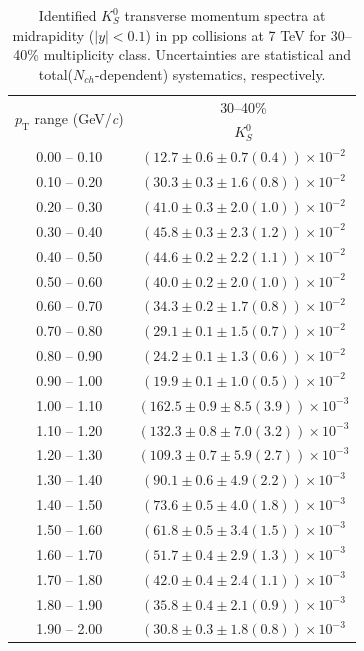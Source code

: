 \begin{table}
\caption{Identified $K^{0}_{S}$ transverse momentum spectra at midrapidity ($|y|<0.1$) in pp collisions at 7 TeV for 30--40\% multiplicity class. Uncertainties are statistical and total($N_{ch}$-dependent) systematics, respectively.}
\label{tab:K0Short_30to40}
\begin{center}
\begin{tabular}{ c | c }
\hline
\multirow{2}{*}{$p_{\mathrm{T}}$ range (GeV/\textit{c})} & \multicolumn{1}{c}{30--40\%} \\ & $K^{0}_{S}$\\ 
\hline
0.00 -- 0.10 & $(12.7\pm0.6\pm0.7(0.4))\times10^{-2}$ \\ 
0.10 -- 0.20 & $(30.3\pm0.3\pm1.6(0.8))\times10^{-2}$ \\ 
0.20 -- 0.30 & $(41.0\pm0.3\pm2.0(1.0))\times10^{-2}$ \\ 
0.30 -- 0.40 & $(45.8\pm0.3\pm2.3(1.2))\times10^{-2}$ \\ 
0.40 -- 0.50 & $(44.6\pm0.2\pm2.2(1.1))\times10^{-2}$ \\ 
0.50 -- 0.60 & $(40.0\pm0.2\pm2.0(1.0))\times10^{-2}$ \\ 
0.60 -- 0.70 & $(34.3\pm0.2\pm1.7(0.8))\times10^{-2}$ \\ 
0.70 -- 0.80 & $(29.1\pm0.1\pm1.5(0.7))\times10^{-2}$ \\ 
0.80 -- 0.90 & $(24.2\pm0.1\pm1.3(0.6))\times10^{-2}$ \\ 
0.90 -- 1.00 & $(19.9\pm0.1\pm1.0(0.5))\times10^{-2}$ \\ 
1.00 -- 1.10 & $(162.5\pm0.9\pm8.5(3.9))\times10^{-3}$ \\ 
1.10 -- 1.20 & $(132.3\pm0.8\pm7.0(3.2))\times10^{-3}$ \\ 
1.20 -- 1.30 & $(109.3\pm0.7\pm5.9(2.7))\times10^{-3}$ \\ 
1.30 -- 1.40 & $(90.1\pm0.6\pm4.9(2.2))\times10^{-3}$ \\ 
1.40 -- 1.50 & $(73.6\pm0.5\pm4.0(1.8))\times10^{-3}$ \\ 
1.50 -- 1.60 & $(61.8\pm0.5\pm3.4(1.5))\times10^{-3}$ \\ 
1.60 -- 1.70 & $(51.7\pm0.4\pm2.9(1.3))\times10^{-3}$ \\ 
1.70 -- 1.80 & $(42.0\pm0.4\pm2.4(1.1))\times10^{-3}$ \\ 
1.80 -- 1.90 & $(35.8\pm0.4\pm2.1(0.9))\times10^{-3}$ \\ 
1.90 -- 2.00 & $(30.8\pm0.3\pm1.8(0.8))\times10^{-3}$ \\ 

\end{tabular}
\end{center}
\end{table}
